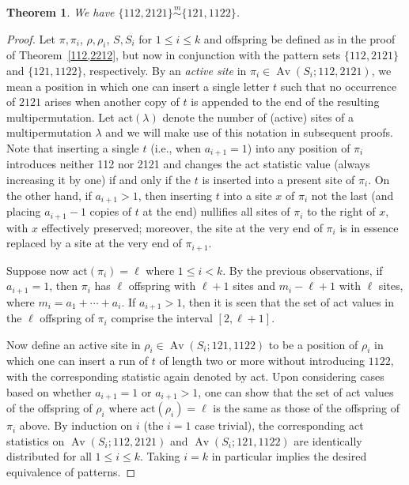 \documentclass[11pt]{amsart}
\theoremstyle{plain}
\newtheorem{theorem}{Theorem}[section]
\theoremstyle{definition}
\newcommand{\csim}{\stackrel{m}{\sim}}
\DeclareMathOperator{\Av}{Av}
\begin{document}
\begin{theorem}\label{112,2121}
We have $\{112,2121\}\csim\{121,1122\}$.
\end{theorem}
\begin{proof}
Let $\pi,\pi_i$, $\rho,\rho_i$, $S,S_i$ for $1 \leq i \leq k$ and offspring be defined as in
the proof of Theorem~\ref{112,2212}, but now in conjunction with the pattern sets $\{112,2121\}$ and
$\{121,1122\}$, respectively.  By an \emph{active site} in $\pi_i \in \Av(S_i;112,2121)$, we mean
a position in which one can insert a single letter $t$ such that no occurrence of $2121$ arises when
another copy of $t$ is appended to the end of the resulting multipermutation.  Let
$\text{act}(\lambda)$ denote the number of (active) sites of a multipermutation $\lambda$ and we will
make use of this notation in subsequent proofs.  Note that inserting a single $t$ (i.e., when
$a_{i+1}=1$) into any position of $\pi_i$ introduces neither 112 nor 2121 and changes the act
statistic value (always increasing it by one) if and only if the $t$ is inserted into a present site
of $\pi_i$.  On the other hand, if $a_{i+1}>1$, then inserting $t$ into a site $x$ of $\pi_i$ not the
last (and placing $a_{i+1}-1$ copies of $t$ at the end) nullifies all sites of $\pi_i$ to the right
of $x$, with $x$ effectively preserved; moreover, the site at the very end of $\pi_i$
is in essence replaced by a site at the very end of $\pi_{i+1}$.

Suppose now $\text{act}(\pi_i)=\ell$ where $1 \leq i<k$.  By the previous observations, if
$a_{i+1}=1$, then $\pi_i$ has $\ell$ offspring with $\ell+1$ sites and $m_i-\ell+1$ with $\ell$
sites, where $m_i=a_1+\cdots+a_i$.  If $a_{i+1}>1$, then it is seen that the set of act values in the
$\ell$ offspring of $\pi_i$ comprise the interval $[2,\ell+1]$.

Now define an active site in $\rho_i
\in \Av(S_i;121,1122)$ to be a position of $\rho_i$ in which one can insert a run of $t$ of length
two or more without introducing $1122$, with the corresponding statistic again denoted by act.  Upon
considering cases based on whether $a_{i+1}=1$ or $a_{i+1}>1$, one can show that the set of act
values of the offspring of $\rho_i$ where $\text{act}(\rho_i)=\ell$ is the same as those of the
offspring of $\pi_i$ above.  By induction on $i$ (the $i=1$ case trivial), the corresponding act
statistics on $\Av(S_i;112,2121)$ and $\Av(S_i;121,1122)$ are identically distributed for all
$1 \leq i \leq k$.  Taking $i=k$ in particular implies the desired equivalence of patterns.
\end{proof}
\end{document}

